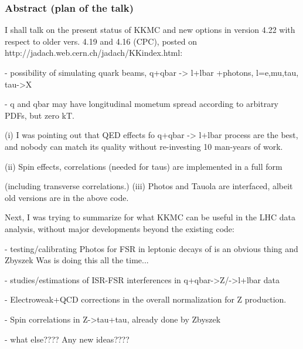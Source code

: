 \documentclass{beamer}
\begin{document}
\begin{frame}[fragile]
\frametitle{Abstract (plan of the talk)}

\footnotesize
I shall talk on the present status of KKMC and
new options in version 4.22 with respect to older vers. 4.19 and 4.16 (CPC),
posted on  http://jadach.web.cern.ch/jadach/KKindex.html:

  - possibility of simulating quark beams, q+qbar -> l+lbar +photons, l=e,mu,tau, tau->X
  
  - q and qbar may have longitudinal mometum spread according to arbitrary PDFs, but zero kT.
  
(i) I was pointing out that QED effects fo q+qbar -> l+lbar process are the best, 
 and nobody can match its quality  without re-investing 10 man-years of work.
 
(ii) Spin effects, correlations  (needed for taus) are implemented in a full form 

  (including transverse correlations.)
(iii) Photos and Tauola are interfaced, albeit old versions are in the above code.

Next, I was trying to summarize for what KKMC can be useful in the LHC data analysis,
without major developments beyond the existing code:

- testing/calibrating Photos for FSR in leptonic decays of
  is an obvious thing and Zbyszek Was is doing this all the time...
  
- studies/estimations of ISR-FSR interferences in q+qbar->Z/->l+lbar data

- Electroweak+QCD corrections in the overall normalization for Z production.

- Spin correlations in Z->tau+tau, already done by Zbyszek

- what else???? Any new ideas????

\end{frame}
\end{document}
